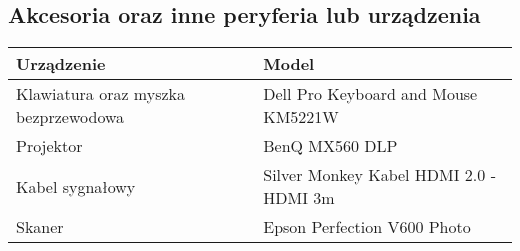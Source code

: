 \pagebreak

\subsection{Akcesoria oraz inne peryferia lub urządzenia}

    \begin{flushleft}
        \begin{table}[h]
            \renewcommand{\arraystretch}{1.5}
            \begin{tabular}{|l|l|}
            \hline
            \textbf{Urządzenie} & \textbf{Model} \\
            \hline
                Klawiatura oraz myszka bezprzewodowa & Dell Pro Keyboard and Mouse KM5221W \\
                Projektor & BenQ MX560 DLP \\
                Kabel sygnałowy & Silver Monkey Kabel HDMI 2.0 - HDMI 3m\\
                Skaner & Epson Perfection V600 Photo \\


            \hline
            \end{tabular}
        \end{table}

    \end{flushleft}    





